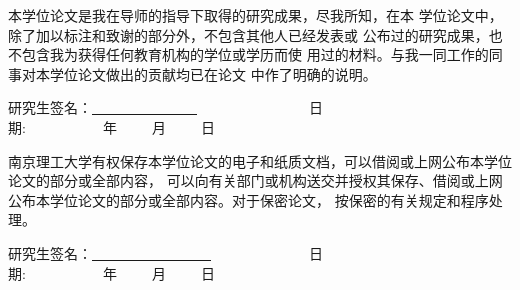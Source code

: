 \ifx\atempxetex\usewhat
\fi
{}

\thispagestyle{empty}
\begin{center}{\sanhao {}}\end{center}

\renewcommand{\baselinestretch}{1.5}\large{}
{\setlength{\parindent}{2em}本学位论文是我在导师的指导下取得的研究成果，尽我所知，在本
 学位论文中，除了加以标注和致谢的部分外，不包含其他人已经发表或
公布过的研究成果，也不包含我为获得任何教育机构的学位或学历而使
用过的材料。与我一同工作的同事对本学位论文做出的贡献均已在论文
中作了明确的说明。}

    \vspace{0.738cm}
    \begin{flushleft}{
    研究生签名：\underline{~~~~~~~~~~~~~~~}~~~~~~~~~~~~~~~~日期:~~~~~~~~~~~年~~~~~月~~~~~日}
    \end{flushleft}

    \vspace{2.214cm}
    \begin{center}{\sanhao {}}
    \end{center}

    \vspace{0.738cm}

\renewcommand{\baselinestretch}{1.5}\large{}
{\setlength{\parindent}{2em}南京理工大学有权保存本学位论文的电子和纸质文档，可以借阅或上网公布本学位论文的部分或全部内容，
可以向有关部门或机构送交并授权其保存、借阅或上网公布本学位论文的部分或全部内容。对于保密论文，
按保密的有关规定和程序处理。}


\vspace{1.476cm}
\begin{flushleft}{
研究生签名：\underline{~~~~~~~~~~~~~~~~~}~~~~~~~~~~~~~~日期:~~~~~~~~~~~年~~~~~月~~~~~日}
\end{flushleft}
\vspace{0.2cm}
\iffalse
\begin{flushleft}{
\hspace*{8pt}导师签名：\underline{~~~~~~~~~~~~~~~~~~~}~~~~~~~~~~~~~~日期:~~~~~~~~~~~年~~~~~月~~~~~日}
\end{flushleft}
\fi
\newpage
